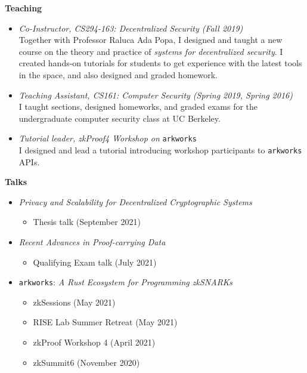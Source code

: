 \documentclass[11pt]{article}
\begin{document}
\begin{cv}{\vspace{-5em}}
  {\clearpage\large\textbf{Teaching}}
  \begin{itemize}
    \item[] \emph{Co-Instructor, {CS294-163}: Decentralized Security (Fall 2019)}\\
      {\small
        Together with Professor Raluca Ada Popa, I designed and taught a new course on the theory and practice of \emph{systems for decentralized security}. I created hands-on tutorials for students to get experience with the latest tools in the space, and also designed and graded homework.
      }
    \item[] \emph{Teaching Assistant, {CS161}: Computer Security (Spring 2019, Spring 2016)}\\
      {\small
      I taught sections, designed homeworks, and graded exams for the undergraduate computer security class at UC Berkeley.}

    \item[] \emph{Tutorial leader, zkProof4 Workshop on} \texttt{arkworks}\\
      {\small
      I designed and lead a tutorial introducing workshop participants to \texttt{arkworks} APIs.}
  \end{itemize}

  {\large\textbf{Talks}}
  \begin{itemize}
    \item[] \emph{Privacy and Scalability for Decentralized Cryptographic Systems}
    \begin{itemize}[noitemsep]
      \item[] Thesis talk (September 2021)
    \end{itemize}

    \item[] \emph{Recent Advances in Proof-carrying Data}
    \begin{itemize}[noitemsep]
      \item[] Qualifying Exam talk (July 2021)
    \end{itemize}

    \item[] \texttt{arkworks}: \emph{A Rust Ecosystem for Programming zkSNARKs} 
    \begin{itemize}[noitemsep]
      \item[] zkSessions (May 2021)
      \item[] RISE Lab Summer Retreat (May 2021)
      \item[] zkProof Workshop 4 (April 2021)
      \item[] zkSummit6 (November 2020)
    \end{itemize}


\end{itemize}
\end{cv}
\end{document}
